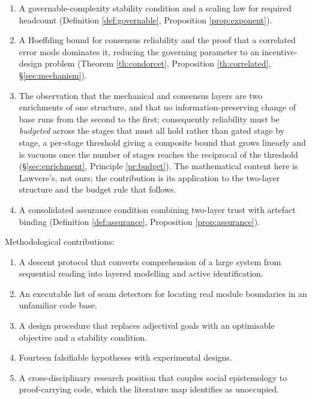 \begin{enumerate}[label=(C\arabic*)]
      insufficient observation from insufficient sampling, of which the linear observability
      rank is the finite-dimensional specialisation (Definition \ref{def:observability},
      Proposition \ref{prop:observability}).
\item A governable-complexity stability condition and a scaling law for required
      headcount (Definition \ref{def:governable}, Proposition \ref{prop:exponent}).
\item A Hoeffding bound for consensus reliability and the proof that a correlated error
      mode dominates it, reducing the governing parameter to an incentive-design problem
      (Theorem \ref{th:condorcet}, Proposition \ref{th:correlated}, \S\ref{sec:mechanism}).
\item The observation that the mechanical and consensus layers are two enrichments of one
      structure, and that no information-preserving change of base runs from the second to the
      first; consequently reliability must be \emph{budgeted} across the stages that must all hold
      rather than gated stage by stage, a per-stage threshold giving a composite bound that grows
      linearly and is vacuous once the number of stages reaches the reciprocal of the
      threshold (\S\ref{sec:enrichment}, Principle \ref{pr:budget}). The mathematical content here
      is Lawvere's, not ours; the contribution is its application to the two-layer structure and
      the budget rule that follows.
\item A consolidated assurance condition combining two-layer trust with artefact binding
      (Definition \ref{def:assurance}, Proposition \ref{prop:assurance}).
\end{enumerate}

Methodological contributions:

\begin{enumerate}[label=(M\arabic*)]
\item A descent protocol that converts comprehension of a large system from sequential
      reading into layered modelling and active identification.
\item An executable list of seam detectors for locating real module boundaries in an
      unfamiliar code base.
\item A design procedure that replaces adjectival goals with an optimisable objective and
      a stability condition.
\item Fourteen falsifiable hypotheses with experimental designs.
\item A cross-disciplinary research position that couples social epistemology to
      proof-carrying code, which the literature map identifies as unoccupied.
\end{enumerate}

